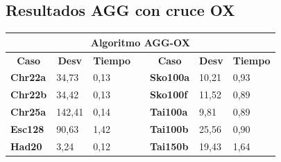 \documentclass[a4paper, 12pt]{article}
\begin{document}
		
	  \newpage
      \subsection{Resultados AGG con cruce OX}
      \begin{table}[H]
\centering
\label{my-label}
\begin{tabular}{|l|l|l|l|l|l|l|}
\hline
\multicolumn{7}{|c|}{\textbf{Algoritmo AGG-OX}}                                                                                                                                                                                                                   \\ \hline
\multicolumn{1}{|c|}{\textbf{Caso}} & \multicolumn{1}{c|}{\textbf{Desv}} & \multicolumn{1}{c|}{\textbf{Tiempo}} & \multicolumn{1}{c|}{\textbf{}} & \multicolumn{1}{c|}{\textbf{Caso}} & \multicolumn{1}{c|}{\textbf{Desv}} & \multicolumn{1}{c|}{\textbf{Tiempo}} \\ \cline{1-3} \cline{5-7} 
\textbf{Chr22a}                     & 34,73                              & 0,13                                 &                                & \textbf{Sko100a}                   & 10,21                              & 0,93                                 \\ \cline{1-3} \cline{5-7} 
\textbf{Chr22b}                     & 34,42                              & 0,13                                 &                                & \textbf{Sko100f}                   & 11,52                              & 0,89                                 \\ \cline{1-3} \cline{5-7} 
\textbf{Chr25a}                     & 142,41                             & 0,14                                 &                                & \textbf{Tai100a}                   & 9,81                               & 0,89                                 \\ \cline{1-3} \cline{5-7} 
\textbf{Esc128}                     & 90,63                              & 1,42                                 &                                & \textbf{Tai100b}                   & 25,56                              & 0,90                                 \\ \cline{1-3} \cline{5-7} 
\textbf{Had20}                      & 3,24                               & 0,12                                 &                                & \textbf{Tai150b}                   & 19,43                              & 1,64                                 \\ \cline{1-3} \cline{5-7} 

\end{tabular}
\end{table}
\end{document}

